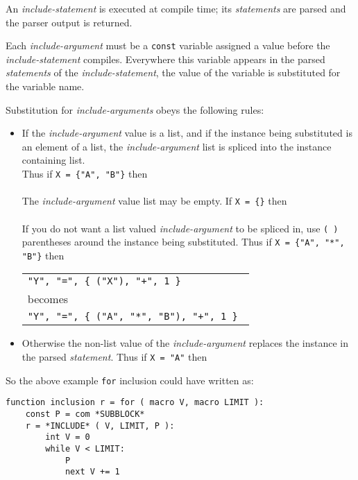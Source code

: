 \documentclass[12pt]{article}
\newenvironment{indpar}[1][0.3in]%
	{\begin{list}{}%
		     {\setlength{\itemsep}{0in}%
		      \setlength{\topsep}{0in}%
		      \setlength{\parsep}{1ex}%
		      \setlength{\labelwidth}{#1}%
		      \setlength{\leftmargin}{#1}%
		      \addtolength{\leftmargin}{\labelsep}}%
	 \item}%
	{\end{list}}
\begin{document}
An {\em include-statement} is executed at compile time;
its {\em statements} are parsed and the parser output is
returned.

Each {\em include-argument} must be a {\tt const} variable assigned
a value before the {\em include-state\-ment} compiles.
Everywhere this variable
appears in the parsed {\em statements} of the {\em include-statement},
the value of the variable is substituted for the variable name.

Substitution for {\em include-arguments} obeys the following rules:
\begin{itemize}
\item \label{INCLUDE-SPLICING} If the {\em include-argument}
value is a list, and if the
instance being substituted is an element of a list,
the {\em include-argument} list is spliced into the instance containing
list.
\\[0.5ex]
Thus if {\tt X = \{"A", "B"\}} then \\
 \\
The {\em include-argument} value list may be empty.
If {\tt X = \{\}} then \\
 \\
If you do not want a list valued {\em include-argument} to be spliced in,
use {\tt (~)} parentheses around the instance being substituted.
Thus if {\tt X = \{"A", "*",  "B"\}} then \\
\hspace*{2em}%
     \begin{tabular}{l}
     \tt "Y", "=", \{ ("X"), "+", 1 \} \\
     becomes \\
     \tt "Y", "=", \{ ("A", "*", "B"), "+", 1 \}
     \end{tabular}

\item Otherwise the non-list value of the {\em include-argument} replaces the
instance in the parsed {\em statement}.
Thus if {\tt X = "A"} then \\
\end{itemize}

So the above example {\tt for} inclusion could have written as:
\begin{indpar}[1em]\begin{verbatim}
function inclusion r = for ( macro V, macro LIMIT ):
    const P = com *SUBBLOCK*
    r = *INCLUDE* ( V, LIMIT, P ):
        int V = 0
        while V < LIMIT:
            P
            next V += 1
\end{verbatim}\end{indpar}
\end{document}
